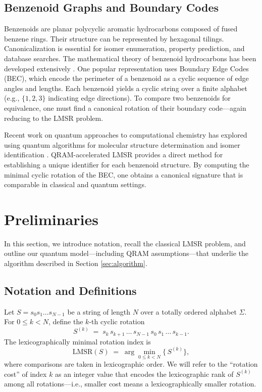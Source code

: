 \documentclass[11pt,letterpaper]{article}
\begin{document}
\subsection{Benzenoid Graphs and Boundary Codes}
Benzenoids are planar polycyclic aromatic hydrocarbons composed of fused benzene rings. Their structure can be represented by hexagonal tilings. Canonicalization is essential for isomer enumeration, property prediction, and database searches. The mathematical theory of benzenoid hydrocarbons has been developed extensively \cite{gutman1989introduction,gutman1986mathematical,cyvin1988kekule}. One popular representation uses Boundary Edge Codes (BEC), which encode the perimeter of a benzenoid as a cyclic sequence of edge angles and lengths. Each benzenoid yields a cyclic string over a finite alphabet (e.g., \(\{1,2,3\}\) indicating edge directions). To compare two benzenoids for equivalence, one must find a canonical rotation of their boundary code---again reducing to the LMSR problem.

Recent work on quantum approaches to computational chemistry has explored using quantum algorithms for molecular structure determination and isomer identification \cite{cao2019quantum}. QRAM-accelerated LMSR provides a direct method for establishing a unique identifier for each benzenoid structure. By computing the minimal cyclic rotation of the BEC, one obtains a canonical signature that is comparable in classical and quantum settings. 

\section{Preliminaries}
\label{sec:preliminaries}

In this section, we introduce notation, recall the classical LMSR problem, and outline our quantum model---including QRAM assumptions---that underlie the algorithm described in Section \ref{sec:algorithm}.

\subsection{Notation and Definitions}
Let \(S = s_0 s_1 \dots s_{N-1}\) be a string of length \(N\) over a totally ordered alphabet \(\Sigma\). For \(0 \le k < N\), define the \(k\)-th cyclic rotation
\[
S^{(k)} \;=\; s_k\,s_{k+1}\,\dots\,s_{N-1}\,s_0\,s_1\,\dots\,s_{k-1}.
\]
The lexicographically minimal rotation index is
\[
\mathrm{LMSR}(S) \;=\; \arg\min_{0 \le k < N} \bigl\{\,S^{(k)}\bigr\},
\]
where comparisons are taken in lexicographic order. We will refer to the ``rotation cost'' of index \(k\) as an integer value that encodes the lexicographic rank of \(S^{(k)}\) among all rotations---i.e., smaller cost means a lexicographically smaller rotation.
\end{document}
